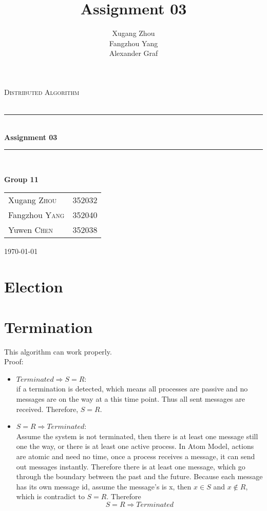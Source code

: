 \documentclass[a4paper, 14pt]{article}
\title{\bf Assignment 03}
\author{Xugang Zhou \\ Fangzhou Yang \\ Alexander Graf}
\newcommand{\HRule}{\rule{\linewidth}{0.5mm}}
\begin{document}
\begin{titlepage}
\begin{center}
\vfill
\textsc{\LARGE Distributed Algorithm}\\[1.5cm]
\textsc{\Large }\\[0.5cm]

\HRule \\[0.4cm]
{\huge \bfseries Assignment 03}\\[0.4cm]
\HRule \\[1.5cm]
\begin{minipage}{0.4\textwidth}
\begin{flushleft} \large
\large{\textbf{Group 11}}
\end{flushleft}
\end{minipage}
\begin{minipage}{0.4\textwidth}
\begin{flushright} \large
\begin{tabular}{ll}
Xugang \textsc{Zhou} & 352032\\
Fangzhou \textsc{Yang} & 352040\\
Yuwen \textsc{Chen} & 352038
\end{tabular}
\end{flushright}
\end{minipage}
\vfill
{\large \today}\\
\end{center}
\end{titlepage}
\thispagestyle{fancy}

\section{Election}

\section{Termination}
This algorithm can work properly.\\
Proof: \\
\begin{itemize}
	\item $Terminated \Rightarrow S = R$:\\
if a termination is detected, which means all processes are passive and no messages are on the way at a this time point. Thus all sent messages are received. Therefore, $S = R$.\\
	\item $S = R \Rightarrow Terminated$:\\
Assume the system is not terminated, then there is at least one message still one the way, or there is at least one active process. In Atom Model, actions are atomic and need no time, once a process receives a message, it can send out messages instantly. Therefore there is at least one message, which go through the boundary between the past and the future. Because each message has its own message id, assume the message's is x, then $x \in S $ and $x \notin R$, which is contradict to $S = R$. Therefore $$S = R \Rightarrow Terminated$$\\
\end{itemize}
\end{document}
